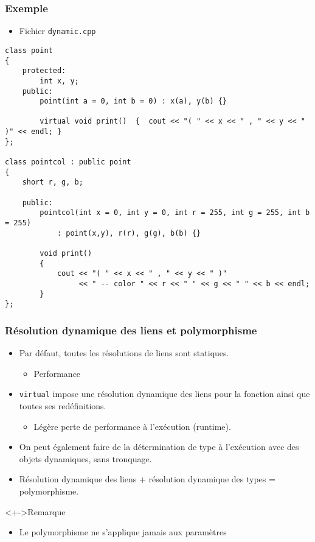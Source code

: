 \begin{frame}[containsverbatim]
\frametitle{Exemple}
\begin{itemize}
\item Fichier \texttt{dynamic.cpp}
\end{itemize}
\begin{lstlisting}
class point
{
	protected:
		int x, y;	
	public:
		point(int a = 0, int b = 0) : x(a), y(b) {}
		
		virtual void print()  {  cout << "( " << x << " , " << y << " )" << endl; }
};

class pointcol : public point
{
	short r, g, b;	
	
	public:
		pointcol(int x = 0, int y = 0, int r = 255, int g = 255, int b = 255) 
			: point(x,y), r(r), g(g), b(b) {}

		void print()
		{
			cout << "( " << x << " , " << y << " )" 
			     << " -- color " << r << " " << g << " " << b << endl;
		}
};
\end{lstlisting}
\end{frame}

\begin{frame}
\frametitle{Résolution dynamique des liens et polymorphisme}
\begin{itemize}[<+->]
\item Par défaut, toutes les résolutions de liens sont statiques.
	\begin{itemize}
	\item Performance
	\end{itemize}
\item \lstinline|virtual| impose une résolution dynamique des liens pour la fonction ainsi que toutes ses redéfinitions.	
	\begin{itemize}
	\item Légère perte de performance à l'exécution (runtime).
	\end{itemize}
\item On peut également faire de la détermination de type à l'exécution avec des objets dynamiques, sans tronquage.
\item Résolution dynamique des liens + résolution dynamique des types = polymorphisme.
\end{itemize}
\begin{alertblock}<+->{Remarque}
	\begin{itemize}
	\item Le polymorphisme ne s'applique jamais aux paramètres
	\end{itemize}
\end{alertblock}
\end{frame}

